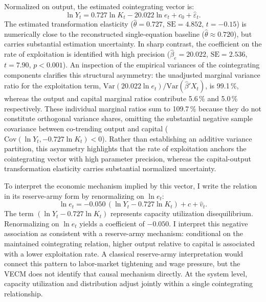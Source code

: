 Normalized on output, the estimated cointegrating vector is:
\begin{equation}
\ln Y_t = 0.727 \ln K_t - 20.022 \ln e_t + c_0 + \hat{\varepsilon}_t.
\label{eq:s2_cointegrating_vector}
\end{equation}
The estimated transformation elasticity ($\hat{\theta} = 0.727$, $\text{SE} = 4.852$, $t = -0.15$) is numerically close to the reconstructed single-equation baseline ($\hat{\theta} \approx 0.720$), but carries substantial estimation uncertainty. In sharp contrast, the coefficient on the rate of exploitation is identified with high precision ($\hat{\beta}_e = 20.022$, $\text{SE} = 2.536$, $t = 7.90$, $p < 0.001$). An inspection of the empirical variances of the cointegrating components clarifies this structural asymmetry: the unadjusted marginal variance ratio for the exploitation term, $\text{Var}(20.022 \ln e_t)/\text{Var}(\hat{\beta}' X_t)$, is 99.1\,\%, whereas the output and capital marginal ratios contribute 5.6\,\% and 5.0\,\% respectively. These individual marginal ratios sum to 109.7\,\% because they do not constitute orthogonal variance shares, omitting the substantial negative sample covariance between co-trending output and capital ($\text{Cov}(\ln Y_t, -0.727 \ln K_t) < 0$). Rather than establishing an additive variance partition, this asymmetry highlights that the rate of exploitation anchors the cointegrating vector with high parameter precision, whereas the capital-output transformation elasticity carries substantial normalized uncertainty.

To interpret the economic mechanism implied by this vector, I write the relation in its reserve-army form by renormalizing on $\ln e_t$:
\begin{equation}
\label{eq:focal_vecm_reserve_army}
\ln e_t = -0.050 \, \left(\ln Y_t - 0.727 \ln K_t\right) + c + \hat{v}_t.
\end{equation}
The term $(\ln Y_t - 0.727 \ln K_t)$ represents capacity utilization disequilibrium. Renormalizing on $\ln e_t$ yields a coefficient of $-0.050$. I interpret this negative association as consistent with a reserve-army mechanism: conditional on the maintained cointegrating relation, higher output relative to capital is associated with a lower exploitation rate. A classical reserve-army interpretation would connect this pattern to labor-market tightening and wage pressure, but the VECM does not identify that causal mechanism directly. At the system level, capacity utilization and distribution adjust jointly within a single cointegrating relationship.

